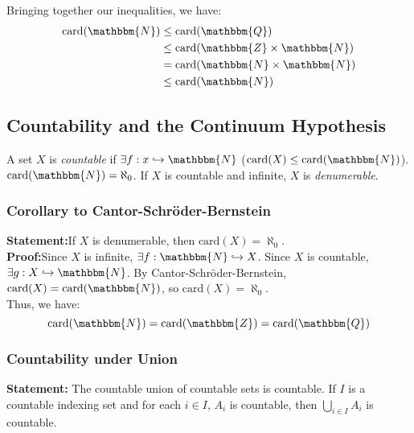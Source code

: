 \documentclass[10pt]{extarticle}
\newcommand{\card}{\text{card}}
\newcommand{\N}{\mathbbm{N}}
\newcommand{\Q}{\mathbbm{Q}}
\newcommand{\Z}{\mathbbm{Z}}
\begin{document}
      Bringing together our inequalities, we have:
      \begin{align*}
        \text{card}(\mathbbm{N}) &\leq \text{card}(\mathbbm{Q})\\
                                &\leq \text{card}(\mathbbm{Z}\times \mathbbm{N})\\
                                &=\text{card}(\mathbbm{N}\times \mathbbm{N})\\
                                &\leq \text{card}(\mathbbm{N})
      \end{align*}
      \subsection{Countability and the Continuum Hypothesis}%
    A set $X$ is \textsl{countable} if $\exists f: x\hookrightarrow \N$ ($\card(X) \leq\card(\N)$). $\card(\N) = \aleph_0$. If $X$ is countable and infinite, $X$ is \textit{denumerable}.
    \subsubsection{Corollary to Cantor-Schröder-Bernstein}%
    \textbf{Statement:}If $X$ is denumerable, then $\card(X) = \aleph_0$.\\
      
    \textbf{Proof:}Since $X$ is infinite, $\exists f: \N\hookrightarrow X$. Since $X$ is countable, $\exists g: X\hookrightarrow \N$. By Cantor-Schröder-Bernstein, $\card(X) = \card(\N)$, so $\card(X) = \aleph_0$.\\

    Thus, we have: 
    \[
      \card(\N) = \card(\Z) = \card(\Q)
    \] 
    \subsubsection{Countability under Union}%
    \textbf{Statement:} The countable union of countable sets is countable. If $I$ is a countable indexing set and for each $i\in I$, $A_i$ is countable, then $\bigcup\limits_{i\in I} A_i$ is countable.\\
\end{document}
